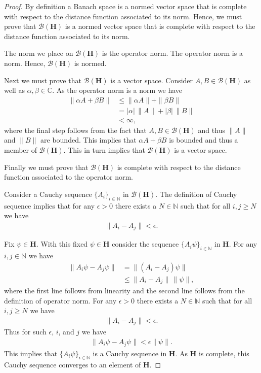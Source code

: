 \begin{proof}
    By definition a Banach space is a normed vector space that is complete with respect to the distance function associated to its norm. Hence, we must prove that $\mathcal{B}(\mathbf{H})$ is a normed vector space that is complete with respect to the distance function associated to its norm.

    The norm we place on $\mathcal{B}(\mathbf{H})$ is the operator norm. The operator norm is a norm. Hence, $\mathcal{B}(\mathbf{H})$ is normed.

    Next we must prove that $\mathcal{B}(\mathbf{H})$ is a vector space. Consider $A, B \in \mathcal{B}(\mathbf{H})$ as well as $\alpha, \beta \in \mathbb{C}$. As the operator norm is a norm we have
    \begin{align}
        \|\alpha A + \beta B\| &\le \|\alpha A\| + \|\beta B\| \\
                               &=    |\alpha| \, \|A\| + |\beta| \, \|B\| \\
                               &< \infty,
    \end{align}
    where the final step follows from the fact that $A, B \in \mathcal{B}(\mathbf{H})$ and thus $\|A\|$ and $\|B\|$ are bounded. This implies that $\alpha A + \beta B$ is bounded and thus a member of $\mathcal{B}(\mathbf{H})$. This in turn implies that $\mathcal{B}(\mathbf{H})$ is a vector space.

    Finally we must prove that $\mathcal{B}(\mathbf{H})$ is complete with respect to the distance function associated to the operator norm.

    Consider a Cauchy sequence $\{A_i\}_{i \in \mathbb{N}}$ in $\mathcal{B}(\mathbf{H})$. The definition of Cauchy sequence implies that for any $\epsilon > 0$ there exists a $N \in \mathbb{N}$ such that for all $i,j \ge N$ we have
    \begin{align}
        \|A_i - A_j\| < \epsilon.
    \end{align}

    Fix $\psi \in \mathbf{H}$. With this fixed $\psi \in \mathbf{H}$ consider the sequence $\{A_i\psi\}_{i \in \mathbb{N}}$ in $\mathbf{H}$. For any $i,j \in \mathbb{N}$ we have
    \begin{align}
        \|A_i\psi - A_j\psi\| &= \|(A_i - A_j)\psi\| \\
                              &\le \|A_i - A_j\| \, \|\psi\|,
    \end{align}
    where the first line follows from linearity and the second line follows from the definition of operator norm. For any $\epsilon > 0$ there exists a $N \in \mathbb{N}$ such that for all $i,j \ge N$ we have
    \begin{align}
        \|A_i - A_j\| < \epsilon.
    \end{align}
    Thus for such $\epsilon$, $i$, and $j$ we have
    \begin{align}
        \|A_i\psi - A_j\psi\| < \epsilon \|\psi\|.
    \end{align}
    This implies that $\{A_i\psi\}_{i \in \mathbb{N}}$ is a Cauchy sequence in $\mathbf{H}$. As $\mathbf{H}$ is complete, this Cauchy sequence converges to an element of $\mathbf{H}$.


\end{proof}
